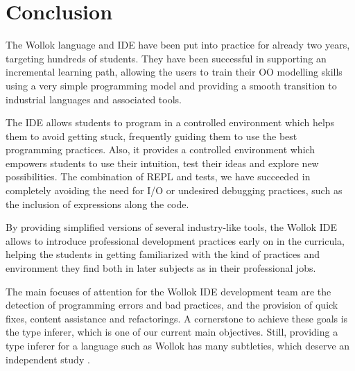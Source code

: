 \section{Conclusion}
\label{sec:conclusion}


The Wollok language and IDE have been put into practice for already two years, targeting hundreds of students.
They have been successful in supporting an incremental learning path, 
allowing the users to train their OO modelling skills using a very simple programming model 
and providing a smooth transition to industrial languages and associated tools.


The IDE allows students to program in a controlled environment which helps them to avoid getting stuck, 
frequently guiding them to use the best programming practices.
Also, it provides a controlled environment which empowers students to use their intuition, test their ideas and explore new possibilities.
The combination of REPL and tests, we have succeeded in completely avoiding the need for I/O or undesired debugging practices, such as the inclusion of  expressions along the code.

By providing simplified versions of several industry-like tools, the Wollok IDE allows to introduce professional development practices early on in the curricula,
helping the students in getting familiarized with the kind of practices and environment they find both in later subjects as in their professional jobs.

\medskip
The main focuses of attention for the Wollok IDE development team are the detection of programming errors and bad practices, and the provision of quick fixes, content assistance and refactorings.
A cornerstone to achieve these goals is the type inferer, which is one of our current main objectives.
Still, providing a type inferer for a language such as Wollok has many subtleties, which deserve an independent study \cite{passerini_nicolas_extensible_2014}.

